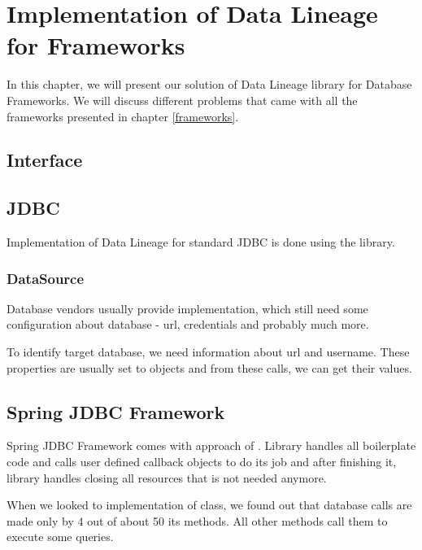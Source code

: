 
\chapter{Implementation of Data Lineage for Frameworks}

In this chapter, we will present our solution of Data Lineage library for Database Frameworks.
We will discuss different problems that came with all the frameworks presented in chapter \ref{frameworks}.

\section{Interface}

\section{JDBC \label{implementation:jdbc}}

Implementation of Data Lineage for standard JDBC is done using the library.




\subsection{DataSource \label{implementation:dataSource}}

Database vendors usually provide  implementation, which still
need some configuration about database - url, credentials and probably much more.

To identify target database, we need information about url and username. These properties
are usually set to  objects and from these calls, we can get
their values.




\section{Spring JDBC Framework}

Spring JDBC Framework comes with approach of . Library handles
all boilerplate code and calls user defined callback objects to do its job
and after finishing it, library handles closing all resources that is not needed anymore.

When we looked to implementation of  class, we found out
that database calls are made only by 4 out of about 50 its methods.
All other methods call them to execute some queries.

